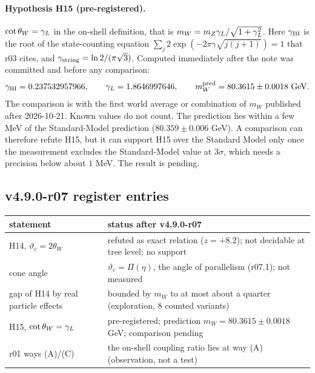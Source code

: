 \paragraph{Hypothesis H15 (pre-registered).}
\(\cot\theta_W=\gamma_L\) in the on-shell definition, that is \(m_W=m_Z\gamma_L/\sqrt{1+\gamma_L^2}\).  Here \(\gamma_{\mathrm{BI}}\) is the root of the
state-counting equation \(\sum_{j}2\exp(-2\pi\gamma\sqrt{j(j+1)})=1\) that r03 cites, and \(\gamma_{\mathrm{string}}=\ln2/(\pi\sqrt3)\).
Computed immediately after the note was committed and before any comparison:
\[
\gBI=0.237532957966,\qquad \gL=1.8646997646,\qquad m_W^{\rm pred}=80.3615\pm0.0018\ \text{GeV}.
\]
The comparison is with the first world average or combination of \(m_W\) published after 2026-10-21.  Known values do not
count.  The prediction lies within a few MeV of the Standard-Model prediction (\(80.359\pm0.006\) GeV).  A comparison can
therefore refute H15, but it can support H15 over the Standard Model only once the measurement excludes the
Standard-Model value at \(3\sigma\), which needs a precision below about \(1\) MeV.  The result is pending.

\subsection*{v4.9.0-r07 register entries}
\label{subsec:v490-r07-register}

\begin{center}
\small
\begin{tabular}{@{}>{\raggedright\arraybackslash}p{}>{\raggedright\arraybackslash}p{}@{}}
\toprule
statement & status after v4.9.0-r07\\
\midrule
H14, \(\vartheta_c=2\theta_W\) & refuted as exact relation (\(z=+8.2\)); not decidable at tree level; no support\\
cone angle & \(\vartheta_c=\Pi(\eta)\), the angle of parallelism (r07.1); not measured\\
gap of H14 by real particle effects & bounded by \(m_W\) to at most about a quarter (exploration, 8 counted variants)\\
H15, \(\cot\theta_W=\gamma_L\) & pre-registered; prediction \(m_W=80.3615\pm0.0018\) GeV; comparison pending\\
r01 ways (A)/(C) & the on-shell coupling ratio lies at way (A) (observation, not a test)\\
\bottomrule
\end{tabular}
\end{center}

